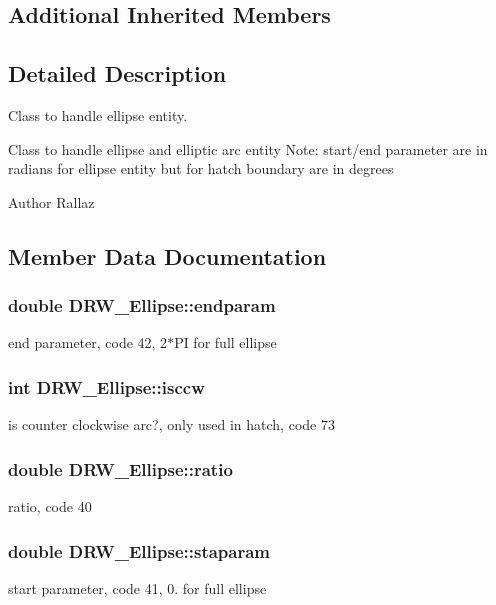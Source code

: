 \subsection*{Additional Inherited Members}


\subsection{Detailed Description}
Class to handle ellipse entity. 

Class to handle ellipse and elliptic arc entity Note\-: start/end parameter are in radians for ellipse entity but for hatch boundary are in degrees \begin{DoxyAuthor}{Author}
Rallaz 
\end{DoxyAuthor}


\subsection{Member Data Documentation}
\hypertarget{classDRW__Ellipse_a69490d7e26d7c8fa602ef4a540b22d52}{
\subsubsection[{endparam}]{\setlength{\rightskip}{0pt plus 5cm}double D\-R\-W\-\_\-\-Ellipse\-::endparam}}\label{classDRW__Ellipse_a69490d7e26d7c8fa602ef4a540b22d52}
end parameter, code 42, 2$\ast$\-P\-I for full ellipse \hypertarget{classDRW__Ellipse_a6a8cd9de5c300fde3c52c26daf66ac77}{
\subsubsection[{isccw}]{\setlength{\rightskip}{0pt plus 5cm}int D\-R\-W\-\_\-\-Ellipse\-::isccw}}\label{classDRW__Ellipse_a6a8cd9de5c300fde3c52c26daf66ac77}
is counter clockwise arc?, only used in hatch, code 73 \hypertarget{classDRW__Ellipse_a5f99577d5e97fa8e0d308a2ab52a2f95}{
\subsubsection[{ratio}]{\setlength{\rightskip}{0pt plus 5cm}double D\-R\-W\-\_\-\-Ellipse\-::ratio}}\label{classDRW__Ellipse_a5f99577d5e97fa8e0d308a2ab52a2f95}
ratio, code 40 \hypertarget{classDRW__Ellipse_a8b9ca88b1d30755bdaa2de0e11116ede}{
\subsubsection[{staparam}]{\setlength{\rightskip}{0pt plus 5cm}double D\-R\-W\-\_\-\-Ellipse\-::staparam}}\label{classDRW__Ellipse_a8b9ca88b1d30755bdaa2de0e11116ede}
start parameter, code 41, 0. for full ellipse 

